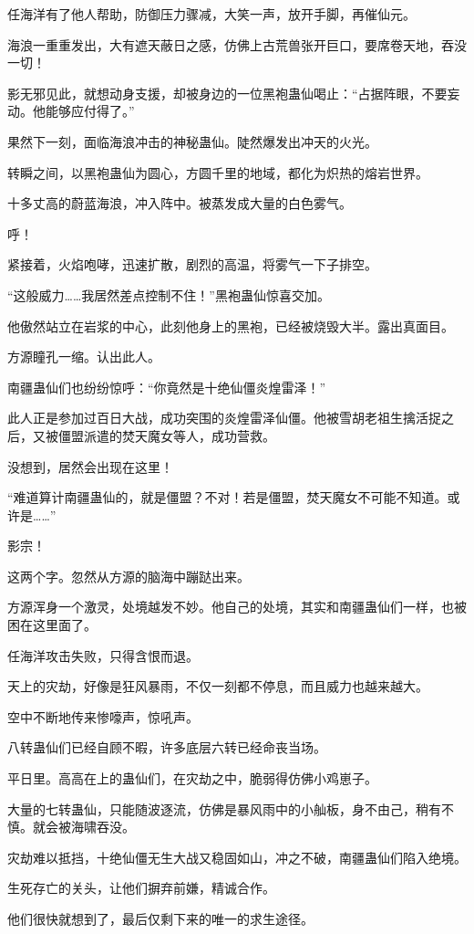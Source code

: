 \begin{this_body}
任海洋有了他人帮助，防御压力骤减，大笑一声，放开手脚，再催仙元。

海浪一重重发出，大有遮天蔽日之感，仿佛上古荒兽张开巨口，要席卷天地，吞没一切！

影无邪见此，就想动身支援，却被身边的一位黑袍蛊仙喝止：“占据阵眼，不要妄动。他能够应付得了。”

果然下一刻，面临海浪冲击的神秘蛊仙。陡然爆发出冲天的火光。

转瞬之间，以黑袍蛊仙为圆心，方圆千里的地域，都化为炽热的熔岩世界。

十多丈高的蔚蓝海浪，冲入阵中。被蒸发成大量的白色雾气。

呼！

紧接着，火焰咆哮，迅速扩散，剧烈的高温，将雾气一下子排空。

“这般威力……我居然差点控制不住！”黑袍蛊仙惊喜交加。

他傲然站立在岩浆的中心，此刻他身上的黑袍，已经被烧毁大半。露出真面目。

方源瞳孔一缩。认出此人。

南疆蛊仙们也纷纷惊呼：“你竟然是十绝仙僵炎煌雷泽！”

此人正是参加过百日大战，成功突围的炎煌雷泽仙僵。他被雪胡老祖生擒活捉之后，又被僵盟派遣的焚天魔女等人，成功营救。

没想到，居然会出现在这里！

“难道算计南疆蛊仙的，就是僵盟？不对！若是僵盟，焚天魔女不可能不知道。或许是……”

影宗！

这两个字。忽然从方源的脑海中蹦跶出来。

方源浑身一个激灵，处境越发不妙。他自己的处境，其实和南疆蛊仙们一样，也被困在这里面了。

任海洋攻击失败，只得含恨而退。

天上的灾劫，好像是狂风暴雨，不仅一刻都不停息，而且威力也越来越大。

空中不断地传来惨嚎声，惊吼声。

八转蛊仙们已经自顾不暇，许多底层六转已经命丧当场。

平日里。高高在上的蛊仙们，在灾劫之中，脆弱得仿佛小鸡崽子。

大量的七转蛊仙，只能随波逐流，仿佛是暴风雨中的小舢板，身不由己，稍有不慎。就会被海啸吞没。

灾劫难以抵挡，十绝仙僵无生大战又稳固如山，冲之不破，南疆蛊仙们陷入绝境。

生死存亡的关头，让他们摒弃前嫌，精诚合作。

他们很快就想到了，最后仅剩下来的唯一的求生途径。


\end{this_body}
